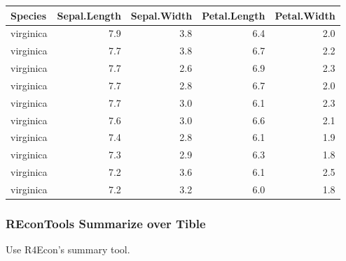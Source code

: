 \documentclass[
]{book}
\newenvironment{Shaded}{\begin{snugshade}}{\end{snugshade}}
\newcommand{\KeywordTok}[1]{\textcolor[rgb]{0.13,0.29,0.53}{\textbf{#1}}}
\newcommand{\NormalTok}[1]{#1}
\newcommand{\OperatorTok}[1]{\textcolor[rgb]{0.81,0.36,0.00}{\textbf{#1}}}
\newcommand{\StringTok}[1]{\textcolor[rgb]{0.31,0.60,0.02}{#1}}
\begin{document}
\begin{table}[!h]
\centering
\begin{tabular}{l|r|r|r|r}
\hline
Species & Sepal.Length & Sepal.Width & Petal.Length & Petal.Width\\
\hline
\rowcolor{gray!6}  virginica & 7.9 & 3.8 & 6.4 & 2.0\\
\hline
virginica & 7.7 & 3.8 & 6.7 & 2.2\\
\hline
\rowcolor{gray!6}  virginica & 7.7 & 2.6 & 6.9 & 2.3\\
\hline
virginica & 7.7 & 2.8 & 6.7 & 2.0\\
\hline
\rowcolor{gray!6}  virginica & 7.7 & 3.0 & 6.1 & 2.3\\
\hline
virginica & 7.6 & 3.0 & 6.6 & 2.1\\
\hline
\rowcolor{gray!6}  virginica & 7.4 & 2.8 & 6.1 & 1.9\\
\hline
virginica & 7.3 & 2.9 & 6.3 & 1.8\\
\hline
\rowcolor{gray!6}  virginica & 7.2 & 3.6 & 6.1 & 2.5\\
\hline
virginica & 7.2 & 3.2 & 6.0 & 1.8\\
\hline
\end{tabular}
\end{table}

\hypertarget{recontools-summarize-over-tible}{%
\subsubsection{REconTools Summarize over Tible}\label{recontools-summarize-over-tible}}

Use R4Econ's summary tool.

\begin{Shaded}
\end{Shaded}
\end{document}

